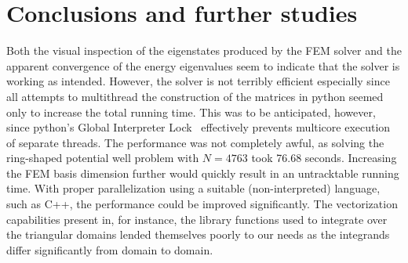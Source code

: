 \documentclass[a4paper,12pt]{article}
\begin{document}
\section{Conclusions and further studies}
Both the visual inspection of the eigenstates produced by the FEM solver and the apparent convergence of the energy eigenvalues seem to indicate that the solver is working as intended. However, the solver is not terribly efficient especially since all attempts to multithread the construction of the matrices in python seemed only to increase the total running time. This was to be anticipated, however, since python's Global Interpreter Lock~\cite{GILdoc} effectively prevents multicore execution of separate threads. The performance was not completely awful, as solving the ring-shaped potential well problem with $N=4763$ took 76.68 seconds. Increasing the FEM basis dimension further would quickly result in an untracktable running time. With proper parallelization using a suitable (non-interpreted) language, such as C++, the performance could be improved significantly. The vectorization capabilities present in, for instance, the library functions used to integrate over the triangular domains lended themselves poorly to our needs as the integrands differ significantly from domain to domain.
\end{document}
